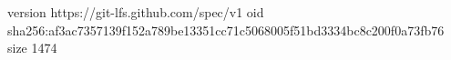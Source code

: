 version https://git-lfs.github.com/spec/v1
oid sha256:af3ac7357139f152a789be13351cc71c5068005f51bd3334bc8c200f0a73fb76
size 1474
